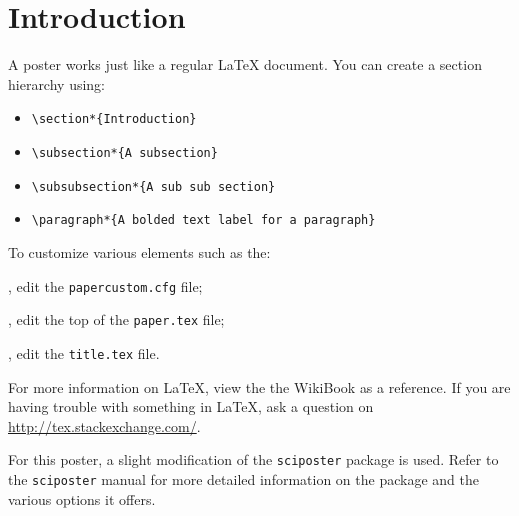 
\section*{Introduction}
A poster works just like a regular \LaTeX{} document.  You can create a section
hierarchy using:
\begin{itemize}
  \setlength{\itemindent}{1em}
  \item \verb+\section*{Introduction}+
  \item \verb+\subsection*{A subsection}+
  \item \verb+\subsubsection*{A sub sub section}+
  \item \verb+\paragraph*{A bolded text label for a paragraph}+
\end{itemize}

\noindent To customize various elements such as the:
\begin{description}
  \setlength{\itemindent}{1em}
  \item[Poster size], edit the \verb+papercustom.cfg+ file;
  \item[Title, authors, etc.], edit the top of the \verb+paper.tex+ file;
  \item[Title format], edit the \verb+title.tex+ file.
\end{description}

\noindent For more information on \LaTeX, view the the WikiBook \citet{wikibook:latex} as a reference.
If you are having trouble with something in \LaTeX, ask a question on \url{http://tex.stackexchange.com/}.

For this poster, a slight modification of the \verb+sciposter+ \citep{website:sciposter} package is used.
Refer to the \verb+sciposter+ manual \citep{manual:sciposter} for more detailed information on the package and the various options it offers.
